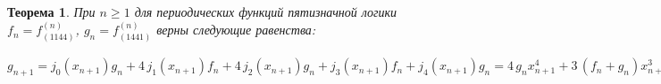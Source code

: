 \documentclass[a4paper, 12pt]{extarticle}
\newtheorem{myth}{Теорема}
\begin{document}
\begin{myth} При $n \geqslant 1 $ для периодических функций пятизначной логики $f_n = f^{\left(n\right)}_{\left(1144\right)}$,
$g_n = f^{\left(n\right)}_{\left(1441\right)}$ верны следующие равенства:
\end{myth}$ g_{n+1} = j_0(x_{n+1})g_n + 4\,j_1(x_{n+1})f_n + 4\,j_2(x_{n+1})g_n + j_3(x_{n+1})f_n + j_4(x_{n+1})g_n = 4 \, g_{n} x_{n+1}^{4} + 3 \, {\left(f_{n} + g_{n}\right)} x_{n+1}^{3} + {\left(2 \, f_{n} + 3 \, g_{n}\right)} x_{n+1}^{2} + 4 \, {\left(f_{n} + g_{n}\right)} x_{n+1} + g_{n}
 = 4 \, g_{n} {\left(x_{n+1} + 1\right)}^{4} + {\left(3 \, f_{n} + 2 \, g_{n}\right)} {\left(x_{n+1} + 1\right)}^{3} + 3 \, {\left(f_{n} + g_{n}\right)} {\left(x_{n+1} + 1\right)}^{2} + {\left(4 \, f_{n} + g_{n}\right)} {\left(x_{n+1} + 1\right)} + g_{n}
 = 4 \, g_{n} {\left(x_{n+1} + 2\right)}^{4} + {\left(3 \, f_{n} + g_{n}\right)} {\left(x_{n+1} + 2\right)}^{3} + {\left(4 \, f_{n} + g_{n}\right)} {\left(x_{n+1} + 2\right)}^{2} + 2 \, f_{n} {\left(x_{n+1} + 2\right)} + f_{n}
 = 4 \, g_{n} {\left(x_{n+1} + 3\right)}^{4} + 3 \, f_{n} {\left(x_{n+1} + 3\right)}^{3} + 2 \, g_{n} {\left(x_{n+1} + 3\right)}^{2} + 3 \, f_{n} {\left(x_{n+1} + 3\right)} + 4 \, g_{n}
 = 4 \, g_{n} {\left(x_{n+1} + 4\right)}^{4} + {\left(3 \, f_{n} + 4 \, g_{n}\right)} {\left(x_{n+1} + 4\right)}^{3} + {\left(f_{n} + g_{n}\right)} {\left(x_{n+1} + 4\right)}^{2} + 2 \, f_{n} {\left(x_{n+1} + 4\right)} + 4 \, f_{n}
$
\end{document}
